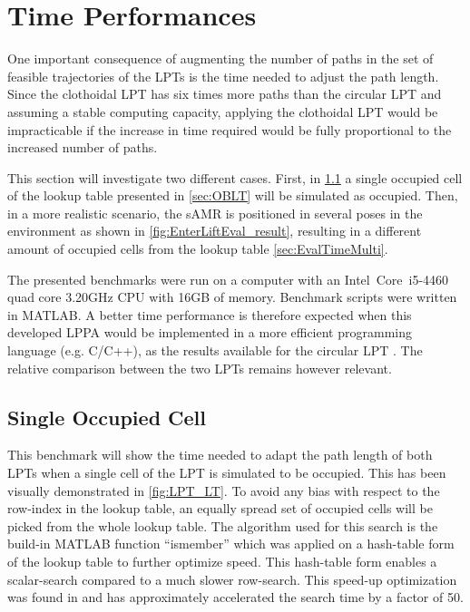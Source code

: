 \newpage

\section{Time Performances} \label{sec:EvalTP}
One important consequence of augmenting the number of paths in the set of feasible trajectories of the LPTs is the time needed to adjust the path length. Since the clothoidal LPT has six times more paths than the circular LPT and assuming a stable computing capacity, applying the clothoidal LPT would be impracticable if the increase in time required would be fully proportional to the increased number of paths. 

This section will investigate two different cases. First, in \cref{sec:EvalTimeSingle} a single occupied cell of the lookup table presented in \cref{sec:OBLT} will be simulated as occupied. Then, in a more realistic scenario, the sAMR is positioned in several poses in the environment as shown in \cref{fig:EnterLiftEval_result}, resulting in a different amount of occupied cells from the lookup table \cref{sec:EvalTimeMulti}.

The presented benchmarks were run on a computer with an Intel\textregistered~Core\texttrademark~i5-4460 quad core 3.20GHz CPU with 16GB of memory. Benchmark scripts were written in MATLAB. A better time performance is therefore expected when this developed LPPA would be implemented in a more efficient programming language (e.g. C/C++), as the results available for the circular LPT \cite{DemeesterEtAl2012}. The relative comparison between the two LPTs remains however relevant.

\subsection{Single Occupied Cell} \label{sec:EvalTimeSingle}
This benchmark will show the time needed to adapt the path length of both LPTs when a single cell of the LPT is simulated to be occupied. This has been visually demonstrated in \cref{fig:LPT_LT}. To avoid any bias with respect to the row-index in the lookup table, an equally spread set of occupied cells will be picked from the whole lookup table. The algorithm used for this search is the build-in MATLAB function ``ismember'' which was applied on a hash-table form of the lookup table to further optimize speed. This hash-table form enables a scalar-search compared to a much slower row-search. This speed-up optimization was found in \cite{Altman2014} and has approximately accelerated the search time by a factor of 50.

